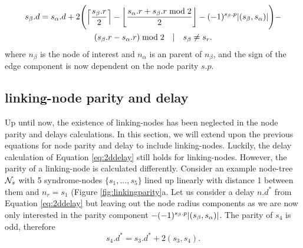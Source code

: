 \begin{multline}\label{eq:2ddelay}
  s_\beta.d = s_\alpha.d + 2\Bigg({\left \lceil \frac{s_\beta.r}{2} \right \rceil } - {\left \lfloor \frac{s_\alpha.r + s_\beta.r \bmod 2}{2} \right \rfloor } - (-1)^{s_\beta.p}\abs{(s_\beta,s_\alpha)}\Bigg) - \\
  (s_\beta.r - s_\alpha.r) \bmod 2 \hspace{1em} | \hspace{1em} s_\beta \neq s_r.
\end{multline}
where $n_\beta$ is the node of interest and $n_\alpha$ is an parent of $n_\beta$, and the sign of the edge component is now dependent on the node parity $s.p$.



\subsection{linking-node parity and delay}\label{sec:linkparitydelay}

Up until now, the existence of linking-nodes has been neglected in the node parity and delays calculations. In this section, we will extend upon the previous equations for node parity and delay to include linking-nodes. Luckily, the delay calculation of Equation \eqref{eq:2ddelay} still holds for linking-nodes. However, the parity of a linking-node is calculated differently. Consider an example node-tree $\mathcal{N}_s$ with 5 syndrome-nodes $\{s_1,...,s_5\}$ lined up linearly with distance 1 between them and $n_r = s_1$ (Figure \ref{fig:linkingparity}a. Let us consider a delay $n.d^*$ from Equation \eqref{eq:2ddelay} but leaving out the node radius components as we are now only interested in the parity component $- (-1)^{s_\beta.p}\abs{(s_\beta,s_\alpha)}$. The parity of $s_4$ is odd, therefore
\begin{equation*}
  s_4.d^* = s_3.d^* + 2(s_3, s_4).
\end{equation*}



